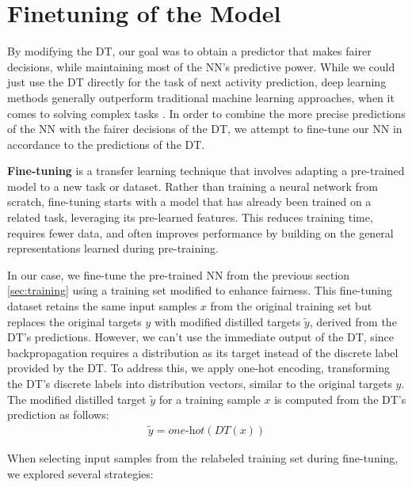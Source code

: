 
\section{Finetuning of the Model}
By modifying the DT, our goal was to obtain a predictor that 
makes fairer decisions, while maintaining most of the NN's predictive power.
While we could just use the DT directly for the task of next activity prediction,
deep learning methods generally outperform traditional machine learning approaches,
when it comes to solving complex tasks \cite{ml_comparison}.
In order to combine the more precise predictions of the NN with the fairer decisions of the DT,
we attempt to fine-tune our NN in accordance to the predictions of the DT.

\textbf{Fine-tuning} \cite{fine_tuning} is a transfer learning technique
that involves adapting a pre-trained model to a new task or dataset.
Rather than training a neural network from scratch,
fine-tuning starts with a model that has already been trained on a related task,
leveraging its pre-learned features.
This reduces training time, requires fewer data, and often improves performance
by building on the general representations learned during pre-training.

In our case, we fine-tune the pre-trained NN from the previous section \ref{sec:training}
using a training set modified to enhance fairness.
This fine-tuning dataset retains the same input samples $x$ from the original training set but replaces
the original targets $y$ with modified distilled targets $\tilde{y}$,
derived from the DT's predictions.
However, we can't use the immediate output of the DT, since backpropagation requires a distribution
as its target instead of the discrete label provided by the DT.
To address this, we apply one-hot encoding, transforming
the DT's discrete labels into distribution vectors,
similar to the original targets $y$.
The modified distilled target $\tilde{y}$ for a training sample $x$ is computed
from the DT's prediction as follows:
\begin{align}
    \tilde{y} = \textit{one-hot}(\textit{DT}(x))
\end{align}

When selecting input samples from the relabeled training set during fine-tuning,
we explored several strategies:

